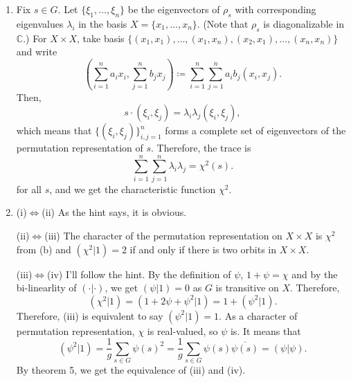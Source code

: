 \documentclass[a4paper, 12pt]{article}
\theoremstyle{Mydefinition}
\theoremstyle{Mytheorem}
\begin{document}
\begin{enumerate}
    \item Fix $s\in G$. Let $\{\xi_1, \ldots, \xi_n\}$ be the eigenvectors of $\rho_s$ with corresponding eigenvalues $\lambda_i$ in the basis $X = \{x_1, \ldots, x_n\}$. (Note that $\rho_s$ is diagonalizable in $\mathbb{C}$.) For $X\times X$, take basis $\{(x_1, x_1), \ldots, (x_1, x_n), (x_2, x_1), \ldots, (x_n, x_n)\}$ and write
    \begin{equation}
        \left(\sum_{i=1}^n a_i x_i, \sum_{j=1}^n b_j x_j\right) \coloneqq \sum_{i=1}^n\sum_{j=1}^na_ib_j\left(x_i, x_j\right).
    \end{equation}
    Then,
    \begin{equation}
        s\cdot (\xi_i, \xi_j) = \lambda_i\lambda_j(\xi_i, \xi_j),
    \end{equation}
    which means that $\{(\xi_i, \xi_j)\}_{i,j=1}^n$ forms a complete set of eigenvectors of the permutation representation of $s$. Therefore, the trace is
    \begin{equation}
        \sum_{i=1}^n\sum_{j=1}^n \lambda_i\lambda_j = \chi^2(s).
    \end{equation}
    for all $s$, and we get the characteristic function $\chi^2$.
    
    \item (i)$\Leftrightarrow$(ii) As the hint says, it is obvious.
    
    (ii)$\Leftrightarrow$(iii) The character of the permutation representation on $X\times X$ is $\chi^2$ from (b) and $(\chi^2|1) = 2$ if and only if there is two orbits in $X\times X$.
    
    (iii)$\Leftrightarrow$(iv) I'll follow the hint. By the definition of $\psi$, $1+\psi = \chi$ and by the bi-linearlity of $(\cdot| \cdot)$, we get $(\psi|1) = 0$ as $G$ is transitive on $X$. Therefore,
    \begin{equation}
        (\chi^2|1) =(1+2\psi+\psi^2|1) = 1+(\psi^2|1).
    \end{equation}
    Therefore, (iii) is equivalent to say $(\psi^2|1) = 1$. As a character of permutation representation, $\chi$ is real-valued, so $\psi$ is. It means that
    \begin{equation}
        (\psi^2|1) = \frac{1}{g}\sum_{s\in G}\psi(s)^2 = \frac{1}{g}\sum_{s\in G}\psi(s)\overline{\psi(s)} = (\psi|\psi).
    \end{equation}
    By theorem 5, we get the equivalence of (iii) and (iv).
\end{enumerate}
\newpage
\end{document}
